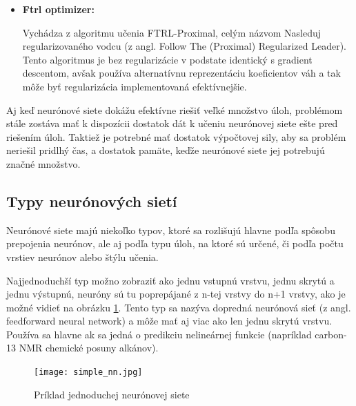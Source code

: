 \begin{itemize}
	Jedná sa o rozšírenie Adagrad optimizéru\cite{adagrad}, ktoré sa snaží zredukovať jeho agresívnu, monotónne klesajúcu rýchlosť učenia. Je robustnejší, prispôsobovanie spomínanej rýchlosti učenia je založené na pohyblivom okne aktualizácií gradientu namiesto akumulácie všetkých minulých gradientov, ako je to pri Adagrad optimizéri. Vďaka tomu je Adadelta schopný pokračovať v učení aj po veľkom množstve epoch a aktualizácií gradientu.\footnote{https://keras.io/optimizers/} 
	
	\item \textbf{Ftrl optimizer:}
	
	Vychádza z algoritmu učenia FTRL-Proximal\cite{ftrl}, celým názvom Nasleduj regularizovaného vodcu (z angl. Follow The (Proximal) Regularized Leader). Tento algoritmus je bez regularizácie v podstate identický s gradient descentom, avšak používa alternatívnu reprezentáciu koeficientov váh a tak môže byť regularizácia implementovaná efektívnejšie.
\end{itemize}

Aj keď neurónové siete dokážu efektívne riešiť veľké množstvo úloh, problémom stále zostáva mať k dispozícii dostatok dát k učeniu neurónovej siete ešte pred riešením úloh. Taktiež je potrebné mať dostatok výpočtovej sily, aby sa problém neriešil pridlhý čas, a dostatok pamäte, keďže neurónové siete jej potrebujú značné množstvo. 	
	 
	
\subsection{Typy neurónových sietí}

Neurónové siete majú niekoľko typov, ktoré  sa rozlišujú hlavne podľa spôsobu prepojenia neurónov, ale aj podľa typu úloh, na ktoré sú určené, či podľa počtu vrstiev neurónov alebo štýlu učenia. %
	
	
Najjednoduchší typ možno zobraziť ako jednu vstupnú vrstvu, jednu skrytú a jednu výstupnú, neuróny sú tu poprepájané z n-tej vrstvy do n+1 vrstvy, ako je možné vidieť na obrázku \ref{simple_nn}. Tento typ sa nazýva dopredná neurónová sieť (z angl. feedforward neural network) a môže mať aj viac ako len jednu skrytú vrstvu. Používa sa hlavne ak sa jedná  o predikciu nelineárnej funkcie (napríklad carbon-13 NMR chemické posuny alkánov\cite{feedforward}). 
	\begin{figure}[H]
		\begin{center}\texttt{[image: simple\_nn.jpg]}\end{center}
		\caption[Jednoduchá neurónová sieť]{Príklad jednoduchej neurónovej siete}\label{simple_nn}
	\end{figure}

